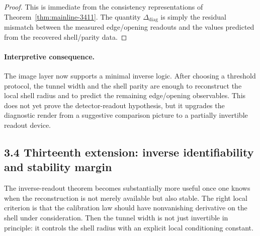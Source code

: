 \documentclass[12pt,a4paper]{article}
\begin{document}
\begin{proof}
This is immediate from the consistency representations of Theorem~\ref{thm:mainline-3411}. The quantity $\Delta_{\mathrm{diag}}$ is simply the residual mismatch between the measured edge/opening readouts and the values predicted from the recovered shell/parity data.
\end{proof}

\paragraph{Interpretive consequence.}
The image layer now supports a minimal inverse logic. After choosing a threshold protocol, the tunnel width and the shell parity are enough to reconstruct the local shell radius and to predict the remaining edge/opening observables. This does not yet prove the detector-readout hypothesis, but it upgrades the diagnostic render from a suggestive comparison picture to a partially invertible readout device.



\subsection*{3.4 Thirteenth extension: inverse identifiability and stability margin}
The inverse-readout theorem becomes substantially more useful once one knows when the reconstruction is not merely available but also stable. The right local criterion is that the calibration law should have nonvanishing derivative on the shell under consideration. Then the tunnel width is not just invertible in principle: it controls the shell radius with an explicit local conditioning constant.
\end{document}

